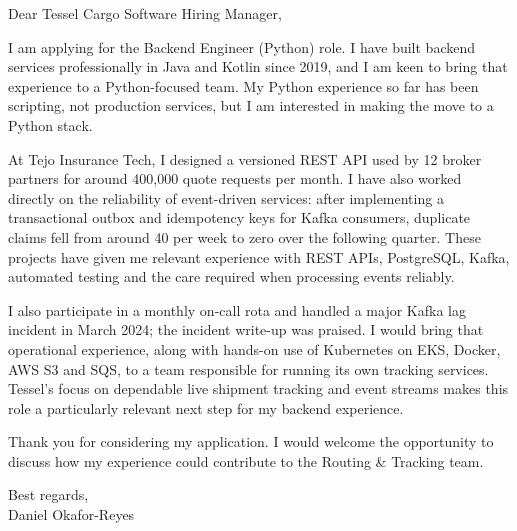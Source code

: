\documentclass[11pt,a4paper]{article}
\begin{document}
\noindent Dear Tessel Cargo Software Hiring Manager,

I am applying for the Backend Engineer (Python) role. I have built backend services professionally in Java and Kotlin since 2019, and I am keen to bring that experience to a Python-focused team. My Python experience so far has been scripting, not production services, but I am interested in making the move to a Python stack.

At Tejo Insurance Tech, I designed a versioned REST API used by 12 broker partners for around 400,000 quote requests per month. I have also worked directly on the reliability of event-driven services: after implementing a transactional outbox and idempotency keys for Kafka consumers, duplicate claims fell from around 40 per week to zero over the following quarter. These projects have given me relevant experience with REST APIs, PostgreSQL, Kafka, automated testing and the care required when processing events reliably.

I also participate in a monthly on-call rota and handled a major Kafka lag incident in March 2024; the incident write-up was praised. I would bring that operational experience, along with hands-on use of Kubernetes on EKS, Docker, AWS S3 and SQS, to a team responsible for running its own tracking services. Tessel’s focus on dependable live shipment tracking and event streams makes this role a particularly relevant next step for my backend experience.

Thank you for considering my application. I would welcome the opportunity to discuss how my experience could contribute to the Routing & Tracking team.

Best regards,\\
Daniel Okafor-Reyes
\end{document}
